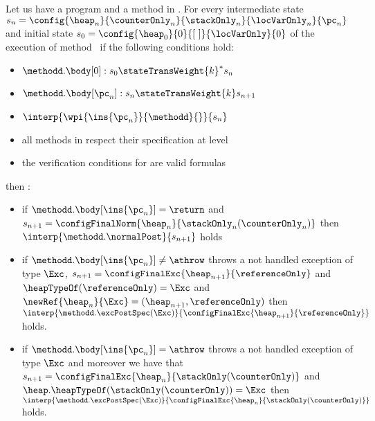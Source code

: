 \begin{lemma} \label{lemma0}
Let us have a program \Program{} and a method \methodd{} in \Program.
For every intermediate state $s_n =\config{\heap_n }{\counterOnly_n }{\stackOnly_n }{\locVarOnly_n }{\pc_n } $ and
 initial state $s_{0} =\config{\heap_{0}  }{ 0 }{\lbrack \ \rbrack }{\locVarOnly }{ 0 } $ 
   of the execution of method \methodd \  if the following conditions hold: 
 \begin{itemize}
         \item $ \methodd.\body[0] : s_{0} \stateTransWeight{k}^{*} s_n$
         \item $ \methodd.\body[\pc_n] : s_n \stateTransWeight{k} s_{n+1}$
         \item $ \interp{\wpi{\ins{\pc_n}}{\methodd}{}}{s_n} $
	 \item all methods in \Program{} respect their specification at level   
	 \item the verification conditions for \Program{} are valid formulas
 \end{itemize}
  
  then : 
 \begin{itemize}
         
        \item if  $ \methodd.\body[\ins{\pc_n}] = \return $ and $s_{n+1} =\configFinalNorm{\heap_n}{\stackOnly_n( \counterOnly_n )} $  then  $ \interp{\methodd.\normalPost}{s_{n+1}}  $   holds
	
	\item if $\methodd.\body[\ins{\pc_n}] \neq \athrow  $ throws a not handled exception of type $\Exc$,
	 $ s_{n+1} = \configFinalExc{ \heap_{n+1}}{  \referenceOnly   }$ and $\heapTypeOf(\referenceOnly) = \Exc  $ and  $\newRef{\heap_n}{\Exc} = (\heap_{n+1}, \referenceOnly )$
	 then  $\interp{\methodd.\excPostSpec( \Exc)}{\configFinalExc{ \heap_{n+1}}{  \referenceOnly   } } $ holds.
	
	 \item if $\methodd.\body[\ins{\pc_n}] = \athrow $ throws a not handled exception of type $\Exc$ and moreover we have that
	 	 $ s_{n+1} =\configFinalExc{ \heap_{n}}{  \stackOnly (\counterOnly)} $ and $\heap.\heapTypeOf(\stackOnly (\counterOnly) ) = \Exc  $ 
	 then  $\interp{\methodd.\excPostSpec( \Exc)}{\configFinalExc{ \heap_{n}}{  \stackOnly (\counterOnly)   } } $  holds.
	 

\end{itemize}
\end{lemma}
